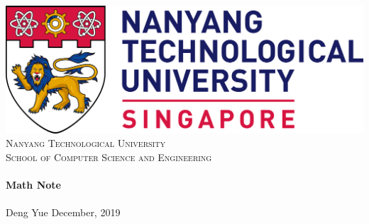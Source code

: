 \begin{titlepage}
\vbox{ }

\vbox{ }

\begin{center}
\includegraphics[scale=0.1]{./sections/img/ntu.png}\\[1cm]
\textsc{\LARGE Nanyang Technological University}\\[1.5cm]
\textsc{\Large School of Computer Science and Engineering}\\[0.5cm]

\vbox{ }
\HRule \\[0.4cm]
{ \huge \bfseries Math Note}\\[0.4cm]
\HRule \\[1.5cm]
\large{Deng Yue}
\vfill
{\large December, 2019}
\end{center}
\end{titlepage}